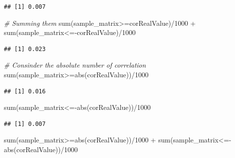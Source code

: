\documentclass[
  notitlepage,
  onecolumn,
  openany]{book}
\newenvironment{Shaded}{\begin{snugshade}}{\end{snugshade}}
\newcommand{\CommentTok}[1]{\textcolor[rgb]{0.56,0.35,0.01}{\textit{#1}}}
\newcommand{\DecValTok}[1]{\textcolor[rgb]{0.00,0.00,0.81}{#1}}
\newcommand{\FunctionTok}[1]{\textcolor[rgb]{0.00,0.00,0.00}{#1}}
\newcommand{\NormalTok}[1]{#1}
\newcommand{\SpecialCharTok}[1]{\textcolor[rgb]{0.00,0.00,0.00}{#1}}
\begin{document}
\begin{verbatim}
## [1] 0.007
\end{verbatim}

\begin{Shaded}
\begin{Highlighting}[]
\CommentTok{\# Summing them}
\FunctionTok{sum}\NormalTok{(sample\_matrix}\SpecialCharTok{\textgreater{}=}\NormalTok{corRealValue)}\SpecialCharTok{/}\DecValTok{1000} \SpecialCharTok{+} \FunctionTok{sum}\NormalTok{(sample\_matrix}\SpecialCharTok{\textless{}={-}}\NormalTok{corRealValue)}\SpecialCharTok{/}\DecValTok{1000}
\end{Highlighting}
\end{Shaded}

\begin{verbatim}
## [1] 0.023
\end{verbatim}

\begin{Shaded}
\begin{Highlighting}[]
\CommentTok{\# Consinder the absolute number of correlation}
\FunctionTok{sum}\NormalTok{(sample\_matrix}\SpecialCharTok{\textgreater{}=}\FunctionTok{abs}\NormalTok{(corRealValue))}\SpecialCharTok{/}\DecValTok{1000}
\end{Highlighting}
\end{Shaded}

\begin{verbatim}
## [1] 0.016
\end{verbatim}

\begin{Shaded}
\begin{Highlighting}[]
\FunctionTok{sum}\NormalTok{(sample\_matrix}\SpecialCharTok{\textless{}={-}}\FunctionTok{abs}\NormalTok{(corRealValue))}\SpecialCharTok{/}\DecValTok{1000}
\end{Highlighting}
\end{Shaded}

\begin{verbatim}
## [1] 0.007
\end{verbatim}

\begin{Shaded}
\begin{Highlighting}[]
\FunctionTok{sum}\NormalTok{(sample\_matrix}\SpecialCharTok{\textgreater{}=}\FunctionTok{abs}\NormalTok{(corRealValue))}\SpecialCharTok{/}\DecValTok{1000} \SpecialCharTok{+} \FunctionTok{sum}\NormalTok{(sample\_matrix}\SpecialCharTok{\textless{}={-}}\FunctionTok{abs}\NormalTok{(corRealValue))}\SpecialCharTok{/}\DecValTok{1000}
\end{Highlighting}
\end{Shaded}
\end{document}
